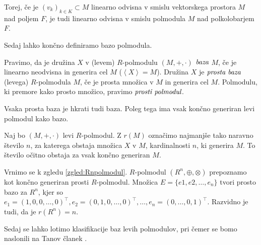 \documentclass[mat1]{fmfdelo}
\newcommand{\pojem}[1]{\ensuremath{\emph{#1}}}
\newcommand{\Gen}[1]{\ensuremath{\left<{#1}\right>}}
\begin{document}
Torej, če je $(v_k)_{k\in K} \subset M$ linearno odvisna v smislu vektorskega prostora $M$ nad poljem $F$, je tudi linearno odvisna v smislu polmodula $M$ nad polkolobarjem $F$.

Sedaj lahko končno definiramo bazo polmodula.

\begin{definicija}\label{def:polmodbaza}
	Pravimo, da je družina $X$ v (levem) $R$-polmodulu $(M, +, \cdot)$ \pojem{baza} $M$, če je linearno neodvisna in generira cel $M$ ($\Gen{X} = M$). Družina $X$ je \pojem{prosta baza} (levega) $R$-polmodula $M$, če je prosta množica v $M$ in generira cel $M$. Polmodulu, ki premore kako prosto množico, pravimo \pojem{prosti polmodul}.
\end{definicija}

\begin{opomba}
	Vsaka prosta baza je hkrati tudi baza. Poleg tega ima vsak končno generiran levi polmodul kako bazo.
\end{opomba}

\begin{definicija}
	Naj bo $(M, +, \cdot)$ levi $R$-polmodul. Z $r(M)$ označimo najmanjše tako naravno število $n$, za katerega obstaja množica $X$ v $M$, kardinalnosti $n$, ki generira $M$. To število očitno obstaja za vsak končno generiran $M$.
\end{definicija}

\begin{zgled}
	Vrnimo se k zgledu \ref{zgled:Rnpolmodul}. $R$-polmodul $(R^n, \oplus, \otimes)$ prepoznamo kot končno generiran prosti $R$-polmodul. Množica $E = \{e1, e2, \ldots, e_n\}$ tvori prosto bazo za $R^n$, kjer so $e_1 = (1, 0, 0, \ldots, 0)^\top, e_2 = (0, 1, 0, \ldots, 0)^\top, \ldots, e_n = (0, \ldots, 0, 1)^\top$. Razvidno je tudi, da je $r(R^n) = n$.
\end{zgled}

Sedaj se lahko lotimo klasifikacije baz levih polmodulov, pri čemer se bomo naslonili na Tanov članek \cite{bib:Tanbase}.
\end{document}
